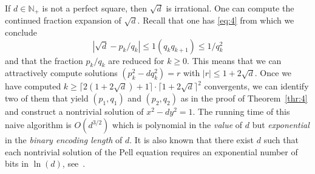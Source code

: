 \documentclass[a4paper,11pt,american]{article}
\theoremstyle{plain}
\theoremstyle{definition}
\begin{document}
  If $d ∈ ℕ_+$ is not a perfect square, then $\sqrt{d}$ is irrational. One can compute the continued fraction expansion of $\sqrt{d}$. Recall that one has  \eqref{eq:4} from which we conclude
  \begin{displaymath}
    | \sqrt{d} - p_k / q_k | ≤ 1 (q_k q_{k+1}) ≤ 1/ q_k^2 
  \end{displaymath}
  and that the fraction $p_k/q_k$ are reduced for $k≥0$. This means that we can attractively compute solutions $(p_k^2 - d q_k^2) = r$ with $|r| ≤ 1 + 2 \sqrt{d}$. Once we have computed  $k ≥ ⌈ 2( 1  + 2\sqrt{d} ) +1 ⌉  ⋅ ⌈1 + 2 \sqrt{d}⌉^2 $ convergents,  we can identify two of them that yield $(p_1,q_1)$ and $(p_2,q_2)$ as in the proof of Theorem~\ref{thr:4} and construct a nontrivial solution of $x^2 - d y^2 = 1$. The running time of this naive algorithm is $O(d^{3/2})$  which is polynomial in the \emph{value } of  $d$ but \emph{exponential} in the \emph{binary encoding length} of $d$. It is also known that there exist $d$ such that each nontrivial solution of the Pell equation requires an exponential number of bits in $\ln (d)$, see~\cite{lenstra2002solving}. 
\end{document}
